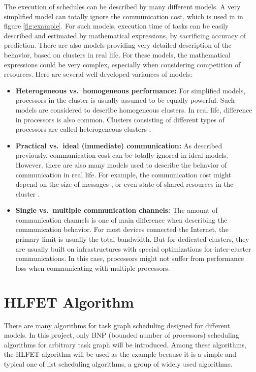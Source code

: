 \documentclass[msc,deptreport, cs]{infthesis}
\begin{document}
The execution of schedules can be described by many different models. A very simplified model can totally ignore the communication cost, which is used in in figure \ref{fig:example}. For such models, execution time of tasks can be easily described and estimated by mathematical expressions, by sacrificing accuracy of prediction. There are also models providing very detailed description of the behavior, based on clusters in real life. For these models, the mathematical expressions could be very complex, especially when considering competition of resources. Here are several well-developed variances of models:
\begin{itemize}
    \item \textbf{Heterogeneous vs.\ homogeneous performance:} For simplified models, processors in the cluster is usually assumed to be equally powerful. Such models are considered to describe homogeneous clusters. In real life, difference in processors is also common. Clusters consisting of different types of processors are called heterogeneous clusters \cite{Topcuoglu}. 
    \item \textbf{Practical vs.\ ideal (immediate) communication:} As described previously, communication cost can be totally ignored in ideal models. However, there are also many models used to describe the behavior of communication in real life. For example, the communication cost might depend on the size of messages \cite{Robert2011}, or even state of shared resources in the cluster \cite{Kwok1999}.
    \item \textbf{Single vs.\ multiple communication channels:} The amount of communication channels is one of main difference when describing the communication behavior. For most devices connected the Internet, the primary limit is usually the total bandwidth. But for dedicated clusters, they are usually built on infrastructures with special optimizations for inter-cluster communications. In this case, processors might not suffer from performance loss when communicating with multiple processors.
\end{itemize}

\section{HLFET Algorithm}

There are many algorithms for task graph scheduling designed for different models. In this project, only BNP (bounded number of processors) scheduling algorithms for arbitrary task graph will be introduced. Among these algorithms, the HLFET algorithm will be used as the example because it is a simple and typical one of list scheduling algorithms, a group of widely used algorithms.
\end{document}
